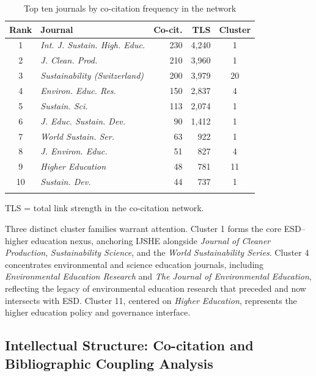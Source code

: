 \documentclass[pdflatex,sn-basic]{sn-jnl}%
\begin{document}
\begin{table}[htbp]
\centering
\caption{Top ten journals by co-citation frequency in the network}\label{tab:journals}
\begin{tabular*}{\textwidth}{@{\extracolsep\fill}clrrc}
\toprule
\textbf{Rank} & \textbf{Journal} & \textbf{Co-cit.} & \textbf{TLS} & \textbf{Cluster} \\
\midrule
1 & \textit{Int. J. Sustain. High. Educ.} & 230 & 4,240 & 1 \\
2 & \textit{J. Clean. Prod.} & 210 & 3,960 & 1 \\
3 & \textit{Sustainability (Switzerland)} & 200 & 3,979 & 20 \\
4 & \textit{Environ. Educ. Res.} & 150 & 2,837 & 4 \\
5 & \textit{Sustain. Sci.} & 113 & 2,074 & 1 \\
6 & \textit{J. Educ. Sustain. Dev.} & 90 & 1,412 & 1 \\
7 & \textit{World Sustain. Ser.} & 63 & 922 & 1 \\
8 & \textit{J. Environ. Educ.} & 51 & 827 & 4 \\
9 & \textit{Higher Education} & 48 & 781 & 11 \\
10 & \textit{Sustain. Dev.} & 44 & 737 & 1 \\
\botrule
\end{tabular*}
\begin{tablenotes}
\item TLS = total link strength in the co-citation network.
\end{tablenotes}
\end{table}

Three distinct cluster families warrant attention. Cluster 1 forms the core ESD--higher education nexus, anchoring IJSHE alongside \textit{Journal of Cleaner Production}, \textit{Sustainability Science}, and the \textit{World Sustainability Series}. Cluster 4 concentrates environmental and science education journals, including \textit{Environmental Education Research} and \textit{The Journal of Environmental Education}, reflecting the legacy of environmental education research that preceded and now intersects with ESD. Cluster 11, centered on \textit{Higher Education}, represents the higher education policy and governance interface.

\subsection{Intellectual Structure: Co-citation and Bibliographic Coupling Analysis}
\end{document}
